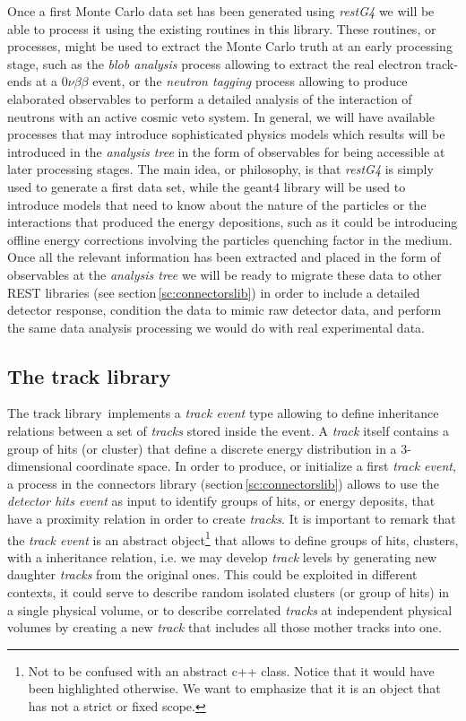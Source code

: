 Once a first Monte Carlo data set has been generated using \emph{restG4} we will be able to process it using the existing routines in this library. These routines, or processes, might be used to extract the Monte Carlo truth at an early processing stage, such as the \emph{blob analysis} process allowing to extract the real electron track-ends at a $0\nu\beta\beta$ event, or the \emph{neutron tagging} process allowing to produce elaborated observables to perform a detailed analysis of the interaction of neutrons with an active cosmic veto system. In general, we will have available processes that may introduce sophisticated physics models which results will be introduced in the \emph{analysis tree} in the form of observables for being accessible at later processing stages. The main idea, or philosophy, is that \emph{restG4} is simply used to generate a first data set, while the geant4 library will be used to introduce models that need to know about the nature of the particles or the interactions that produced the energy depositions, such as it could be introducing offline energy corrections involving the particles quenching factor in the medium. Once all the relevant information has been extracted and placed in the form of observables at the \emph{analysis tree} we will be ready to migrate these data to other REST libraries (see section\,\ref{sc:connectorslib}) in order to include a detailed detector response, condition the data to mimic raw detector data, and perform the same data analysis processing we would do with real experimental data.

\subsection{The track library}\label{sc:tracklib}

The track library\,\cite{REST_Track_Git} implements a \emph{track event} type allowing to define inheritance relations between a set of \emph{tracks} stored inside the event. A \emph{track} itself contains a group of hits (or cluster) that define a discrete energy distribution in a 3-dimensional coordinate space. In order to produce, or initialize a first \emph{track event}, a process in the connectors library (section\,\ref{sc:connectorslib}) allows to use the \emph{detector hits event} as input to identify groups of hits, or energy deposits, that have a proximity relation in order to create \emph{tracks}. It is important to remark that the \emph{track event} is an abstract object\footnote{Not to be confused with an abstract c++ class. Notice that it would have been highlighted otherwise. We want to emphasize that it is an object that has not a strict or fixed scope.} that allows to define groups of hits, clusters, with a inheritance relation, i.e. we may develop \emph{track} levels by generating new daughter \emph{tracks} from the original ones. This could be exploited in different contexts, it could serve to describe random isolated clusters (or group of hits) in a single physical volume, or to describe correlated \emph{tracks} at independent physical volumes by creating a new \emph{track} that includes all those mother tracks into one.

